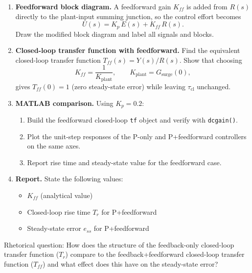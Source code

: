 \documentclass[11pt]{article}
\begin{document}
\begin{enumerate}

\item \textbf{Feedforward block diagram.}
  A feedforward gain $K_{ff}$ is added from $R(s)$ directly to the plant-input
  summing junction, so the control effort becomes
  \[
    U(s) = K_p\,E(s) + K_{ff}\,R(s).
  \]
  Draw the modified block diagram and label all signals and blocks.

\item \textbf{Closed-loop transfer function with feedforward.}
  Find the equivalent closed-loop transfer function $T_{ff}(s) = Y(s)/R(s)$.  Show that choosing
  \[
    K_{ff} = \frac{1}{K_{\mathrm{plant}}}, \qquad K_{\mathrm{plant}} = G_{\mathrm{surge}}(0),
  \]
  gives $T_{ff}(0) = 1$ (zero steady-state error) while leaving
  $\tau_{\mathrm{cl}}$ unchanged.

\item \textbf{MATLAB comparison.}
  Using $K_p = 0.2$:
  \begin{enumerate}
    \item Build the feedforward closed-loop \texttt{tf} object and verify with
          \texttt{dcgain()}.
    \item Plot the unit-step responses of the P-only and P+feedforward
          controllers on the same axes.
    \item Report rise time and steady-state value for the feedforward case.
  \end{enumerate}

\item \textbf{Report.}
  State the following values:
  \begin{itemize}
    \item $K_{ff}$ (analytical value)
    \item Closed-loop rise time $T_r$ for P+feedforward
    \item Steady-state error $e_{ss}$ for P+feedforward
  \end{itemize}

\end{enumerate}

Rhetorical question: How does the structure of the feedback-only closed-loop transfer function ($T_r$) compare to the feedback+feedforward closed-loop transfer function ($T_{ff}$) and what effect does this have on the steady-state error?
\end{document}
